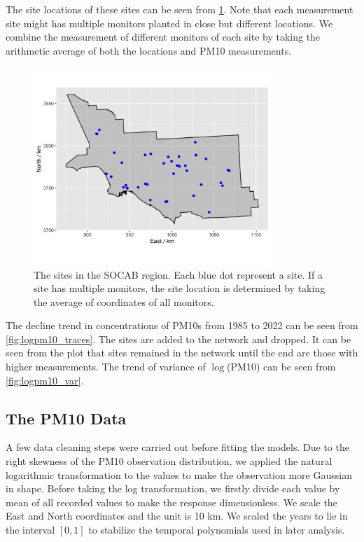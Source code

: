 The site locations of these sites can be seen from \cref{fig:socab_sites}. Note that each measurement site might has 
multiple monitors planted in close but different locations. We combine the measurement of different
monitors of each site by taking the arithmetic average of both the locations and PM10 measurements.
\begin{figure}[ht]
	\centering
	\includegraphics[width = 0.8\textwidth]{socab_plots/SOCAB_sites.png}
	\caption{The sites in the SOCAB region. Each blue dot represent a site. If a site has multiple monitors, the site location is determined by taking the average of coordinates of all monitors.}
	\label{fig:socab_sites}
\end{figure}

The decline trend in concentrations of PM10s from 1985 to 2022 can be seen from \cref{fig:logpm10_traces}. The sites are added 
to the network and dropped. It can be seen from the plot that sites remained in the network until 
the end are those with higher measurements.
The trend of variance of $\log$(PM10) can be seen from \ref{fig:logpm10_var}. 
\subsection{The PM10 Data}
A few data cleaning steps were carried out before fitting the models. Due to the right skewness of 
the PM10 observation distribution, we applied the natural logarithmic transformation to the values
to make the observation more Gaussian in shape. Before taking the log transformation, we firstly divide
each value by mean of all recorded values to make the response dimensionless.
We scale the East and North coordinates and the unit is 10 km. We scaled the years to
lie in the interval $[0, 1]$ to stabilize the temporal polynomials used in later analysis.

